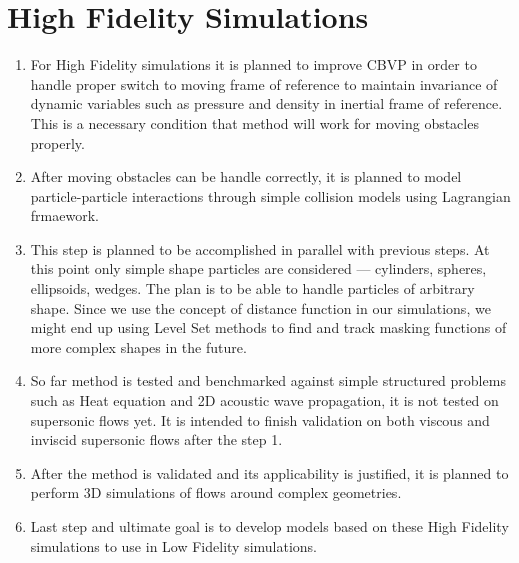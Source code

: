 \section{High Fidelity Simulations}
\begin{enumerate}[1.]
\item
{} For High Fidelity simulations it is planned to improve CBVP in order to handle proper switch to moving frame of reference to maintain invariance of dynamic variables such as pressure and density in inertial frame of reference. This is a necessary condition that method will work for moving obstacles properly.

\item
{} After moving obstacles can be handle correctly, it is planned to model particle-particle interactions through simple collision models using Lagrangian frmaework.

\item
{} This step is planned to be accomplished in parallel with previous steps. At this point only simple shape particles are considered --- cylinders, spheres, ellipsoids, wedges. The plan is to be able to handle particles of arbitrary shape. Since we use the concept of distance function in our simulations, we might end up using Level Set methods \cite{book:levset} to find and track masking functions of more complex shapes in the future.

\item
{} So far method is tested and benchmarked against simple structured problems such as Heat equation and 2D acoustic wave propagation, it is not tested on supersonic flows yet. It is intended to finish validation on both viscous and inviscid supersonic flows after the step 1.

\item
{} After the method is validated and its applicability is justified, it is planned to perform 3D simulations of flows around complex geometries.

\item
{} Last step and ultimate goal is to develop models based on these High Fidelity simulations to use in Low Fidelity simulations. 
\end{enumerate}

